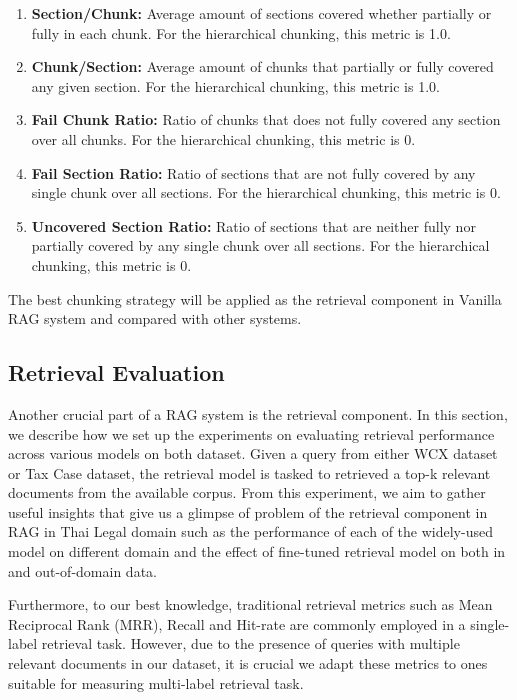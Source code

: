 \begin{enumerate}
    \item \textbf{Section/Chunk: }Average amount of sections covered whether partially or fully in each chunk. For the hierarchical chunking, this metric is 1.0.
    \item \textbf{Chunk/Section: }Average amount of chunks that partially or fully covered any given section. For the hierarchical chunking, this metric is 1.0.
    \item \textbf{Fail Chunk Ratio: }Ratio of chunks that does not fully covered any section over all chunks. For the hierarchical chunking, this metric is 0.
    \item \textbf{Fail Section Ratio: }Ratio of sections that are not fully covered by any single chunk over all sections. For the hierarchical chunking, this metric is 0.
    \item \textbf{Uncovered Section Ratio: }Ratio of sections that are neither fully nor partially covered by any single chunk over all sections. For the hierarchical chunking, this metric is 0.
\end{enumerate}
The best chunking strategy will be applied as the retrieval component in Vanilla RAG system and compared with other systems.

\subsection{Retrieval Evaluation}
\label{subsec:re}

Another crucial part of a RAG system is the retrieval component. In this section, we describe how we set up the experiments on evaluating retrieval performance across various models on both dataset. Given a query from either WCX dataset or Tax Case dataset, the retrieval model is tasked to retrieved a top-k relevant documents from the available corpus. From this experiment, we aim to gather useful insights that give us a glimpse of problem of the retrieval component in RAG in Thai Legal domain such as the performance of each of the widely-used model on different domain and the effect of fine-tuned retrieval model on both in and out-of-domain data.

Furthermore, to our best knowledge, traditional retrieval metrics such as Mean Reciprocal Rank (MRR), Recall and Hit-rate are commonly employed in a single-label retrieval task. However, due to the presence of queries with multiple relevant documents in our dataset, it is crucial we adapt these metrics to ones suitable for measuring multi-label retrieval task.

